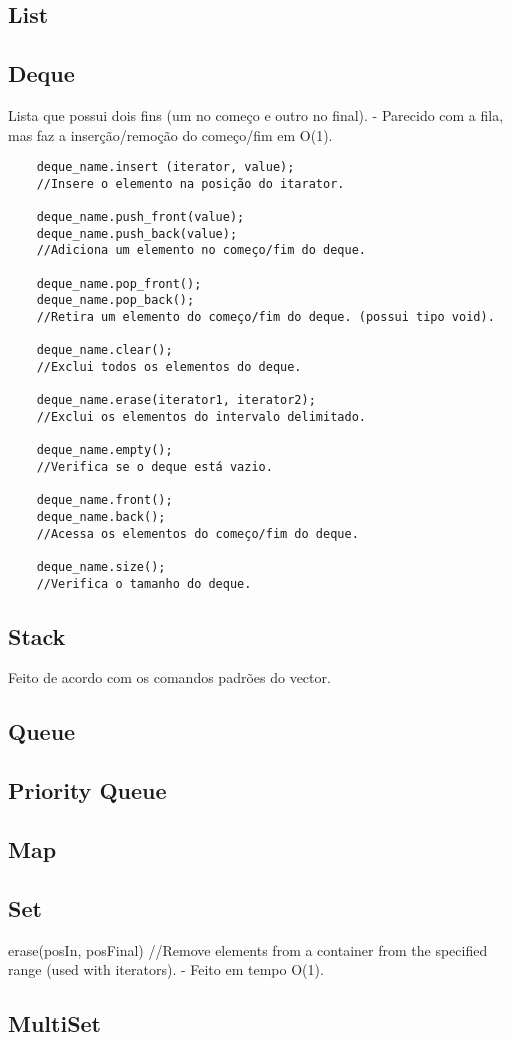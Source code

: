 \subsection{List}


\subsection{Deque}
    Lista que possui dois fins (um no começo e outro no final).
    - Parecido com a fila, mas faz a inserção/remoção do começo/fim em O(1).
\begin{verbatim}
    deque_name.insert (iterator, value);
    //Insere o elemento na posição do itarator.

    deque_name.push_front(value);
    deque_name.push_back(value);
    //Adiciona um elemento no começo/fim do deque.

    deque_name.pop_front();
    deque_name.pop_back();
    //Retira um elemento do começo/fim do deque. (possui tipo void).

    deque_name.clear();
    //Exclui todos os elementos do deque.

    deque_name.erase(iterator1, iterator2);
    //Exclui os elementos do intervalo delimitado.

    deque_name.empty();
    //Verifica se o deque está vazio.

    deque_name.front();
    deque_name.back();
    //Acessa os elementos do começo/fim do deque.

    deque_name.size();
    //Verifica o tamanho do deque.
\end{verbatim}

\subsection{Stack}
    Feito de acordo com os comandos padrões do vector.

\subsection{Queue}

\subsection{Priority Queue}

\subsection{Map}

\subsection{Set}    
    erase(posIn, posFinal) 
    //Remove elements from a container from the specified range (used with iterators).
    - Feito em tempo O(1).

\subsection{MultiSet} 

\pagebreak